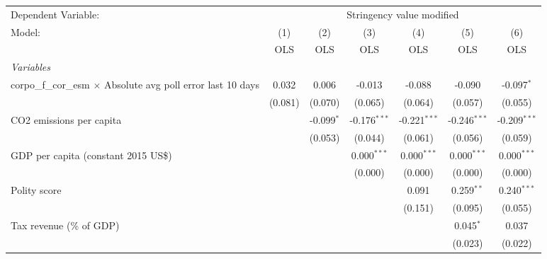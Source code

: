 
\begingroup
\centering
\begin{tabular}{lcccccc}
   \toprule
   Dependent Variable: & \multicolumn{6}{c}{Stringency value modified}\\
   Model:                                                               & (1)     & (2)          & (3)            & (4)            & (5)            & (6)\\  
                                                                        &  OLS    & OLS          & OLS            & OLS            & OLS            & OLS\\  
   \midrule
   \emph{Variables}\\
   corpo\_f\_cor\_esm $\times$ Absolute avg poll error last 10 days     & 0.032   & 0.006        & -0.013         & -0.088         & -0.090         & -0.097$^{*}$\\   
                                                                        & (0.081) & (0.070)      & (0.065)        & (0.064)        & (0.057)        & (0.055)\\   
   CO2 emissions per capita                                             &         & -0.099$^{*}$ & -0.176$^{***}$ & -0.221$^{***}$ & -0.246$^{***}$ & -0.209$^{***}$\\   
                                                                        &         & (0.053)      & (0.044)        & (0.061)        & (0.056)        & (0.059)\\   
   GDP per capita (constant 2015 US\$)                                  &         &              & 0.000$^{***}$  & 0.000$^{***}$  & 0.000$^{***}$  & 0.000$^{***}$\\   
                                                                        &         &              & (0.000)        & (0.000)        & (0.000)        & (0.000)\\   
   Polity score                                                         &         &              &                & 0.091          & 0.259$^{**}$   & 0.240$^{***}$\\   
                                                                        &         &              &                & (0.151)        & (0.095)        & (0.055)\\   
   Tax revenue (\% of GDP)                                              &         &              &                &                & 0.045$^{*}$    & 0.037\\   
                                                                        &         &              &                &                & (0.023)        & (0.022)\\   

\end{tabular}
